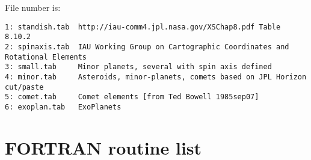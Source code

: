 \documentclass[draft]{article}
\begin{document}
File number is: 
\vspace{-3.mm} 
\begin{verbatim}
1: standish.tab  http://iau-comm4.jpl.nasa.gov/XSChap8.pdf Table 8.10.2
2: spinaxis.tab  IAU Working Group on Cartographic Coordinates and Rotational Elements
3: small.tab     Minor planets, several with spin axis defined
4: minor.tab     Asteroids, minor-planets, comets based on JPL Horizon cut/paste
5: comet.tab     Comet elements [from Ted Bowell 1985sep07]
6: exoplan.tab   ExoPlanets
\end{verbatim} 

 \section{FORTRAN routine list}
\vspace{-3.mm} 
\end{document}
